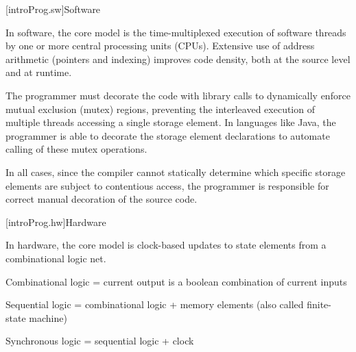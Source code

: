 
\pnum
{}[introProg.sw]{Software}

In software, the core model is the time-multiplexed execution
of software threads by one or more central processing units (CPUs).
Extensive use of address arithmetic (pointers
and indexing) improves code density, both at the source level and at
runtime.

The programmer
must decorate the code with library calls to dynamically enforce
mutual exclusion (mutex) regions, preventing the interleaved execution of
multiple threads accessing a single storage element.
In languages like Java, the programmer is able to decorate the
storage element declarations to automate calling of these mutex operations.

In all cases, since the compiler cannot statically determine which specific
storage elements are subject to contentious access, the programmer is responsible
for correct manual decoration of the source code.

[introProg.hw]{Hardware}

In hardware, the core model is clock-based updates to state elements from
a combinational logic net.

Combinational logic = current output is a boolean combination of current inputs

Sequential logic = combinational logic + memory elements
(also called finite-state machine)

Synchronous logic = sequential logic + clock


